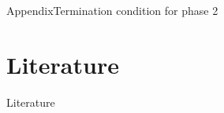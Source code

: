\documentclass[aspectratio=169, hyperref={colorlinks=true, allcolors=SecondaryColor}, c]{beamer}
\begin{document}
	\begin{frame}[fragile]{Appendix}{Termination condition for phase 2}
	\end{frame}
\else
\fi

\ifliterature
	\section{Literature}

	\begin{frame}[allowframebreaks]{Literature}
		\printbibliography
	\end{frame}


\else
\fi
\end{document}
